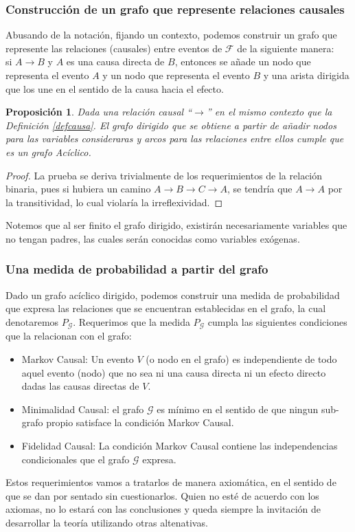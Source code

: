 \documentclass[11pt]{article}
\theoremstyle{plain}
\newtheorem{prop}[teo]{Proposición}
\begin{document}
\subsubsection{Construcción de un grafo que represente relaciones causales}
Abusando de la notación, fijando un contexto, podemos construir un grafo que represente las relaciones (causales) entre eventos de $\mathcal{F}$ de la siguiente manera: \\
si $A \to B$ y $A$ es una causa directa de $B$, entonces se añade un nodo que representa el evento $A$ y un nodo que representa el evento $B$ y una arista dirigida que los une en el sentido de la causa hacia el efecto.
\begin{prop}
Dada una relación causal “$\to$” en el mismo contexto que la Definición \ref{defcausa}. El grafo dirigido que se obtiene a partir de añadir nodos para las variables consideraras y arcos para las relaciones entre ellos cumple que es un grafo Acíclico.
\end{prop}
\begin{proof}
La prueba se deriva trivialmente de los requerimientos de la relación binaria, pues si hubiera un camino $A \to B \to C \to A$, se tendría que $A \to A$ por la transitividad, lo cual violaría la irreflexividad.
\end{proof}
Notemos que al ser finito el grafo dirigido, existirán necesariamente variables que no tengan padres, las cuales serán conocidas como variables exógenas.

\subsubsection{Una medida de probabilidad a partir del grafo}
Dado un grafo acíclico dirigido, podemos construir una medida de probabilidad que expresa las relaciones que se encuentran establecidas en el grafo, la cual denotaremos $P_{\mathcal{G}}$. Requerimos que la medida $P_{\mathcal{G}}$ cumpla las siguientes condiciones que la relacionan con el grafo:
\begin{itemize}
\item Markov Causal: Un evento $V$ (o nodo en el grafo) es independiente de todo aquel evento (nodo) que no sea ni una causa directa ni un efecto directo dadas las causas directas de $V$.
\item Minimalidad Causal: el grafo $\mathcal{G}$ es mínimo en el sentido de que ningun sub-grafo propio satisface la condición Markov Causal.
\item Fidelidad Causal: La condición Markov Causal contiene las independencias condicionales que el grafo $\mathcal{G}$ expresa.
\end{itemize}
Estos requerimientos vamos a tratarlos de manera axiomática, en el sentido de que se dan por sentado sin cuestionarlos. Quien no esté de acuerdo con los axiomas, no lo estará con las conclusiones y queda siempre la invitación de desarrollar la teoría utilizando otras altenativas.
\end{document}
